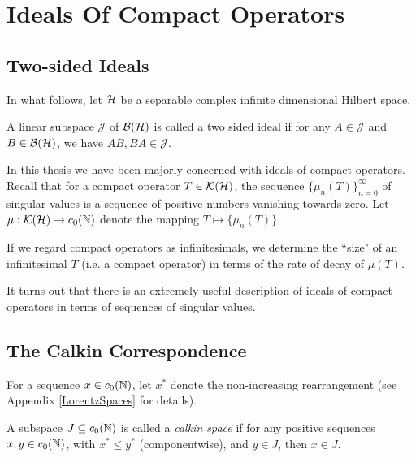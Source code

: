 
\chapter{Ideals Of Compact Operators} %

\label{IdealsOfOperators} %


\section{Two-sided Ideals}
In what follows, let $\mathcal{H}$ be a separable complex infinite dimensional Hilbert space.
\begin{definition}
    A linear subspace $\mathcal{J}$ of $\mathcal{B}(\mathcal{H})$ is called a two
    sided ideal
    if for any $A \in \mathcal{J}$ and $B \in \mathcal{B}(\mathcal{H})$, we
    have $AB,BA \in \mathcal{J}$.
\end{definition}

In this thesis we have been majorly concerned with
ideals of compact operators. Recall
that for a compact operator $T \in \mathcal{K}(\mathcal{H})$,
the sequence $\{\mu_n(T)\}_{n=0}^\infty$ of singular
values is a sequence of positive numbers vanishing towards zero. Let
$\mu:\mathcal{K}(\mathcal{H})\to c_0(\mathbb{N})$ denote the mapping
$T \mapsto \{\mu_n(T)\}$. 

If we regard compact operators as infinitesimals, we determine
the ``size" of an infinitesimal $T$ (i.e. a compact operator)
in terms of the rate of decay of $\mu(T)$. 

 It turns out that there is
an extremely useful description of ideals of compact operators
in terms of sequences of singular values. 
\section{The Calkin Correspondence}
\begin{definition}
    For a sequence $x \in c_0(\mathbb{N})$, let $x^*$
    denote the non-increasing rearrangement (see Appendix \ref{LorentzSpaces}
    for details).

    A subspace $J \subseteq c_0(\mathbb{N})$ is called a 
    \emph{calkin space} 
    if for any positive sequences $x,y \in c_0(\mathbb{N})$,
    with $x^* \leq y^*$ (componentwise), and $y \in J$,
    then $x \in J$.
\end{definition}

